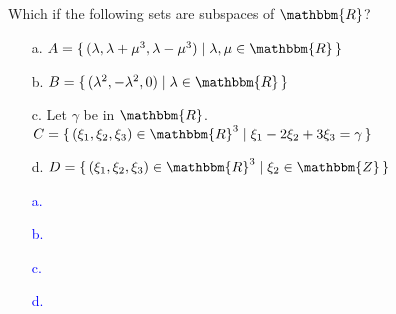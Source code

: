 \documentclass[a4paper,12pt]{article}
\newcommand{\Br}[1]{\{\, #1 \,\}}
\newcommand{\R}{\mathbbm{R}}
\newcommand{\Z}{\mathbbm{Z}}
\begin{document}
\subsection{}
Which if the following sets are subspaces of $\R$?
\begin{itemize}
 \item [a.] $A = \Br{(\lambda,\lambda+\mu^3,\lambda-\mu^3) \mid \lambda, \mu \in \R}$
 \item [b.] $B = \Br{(\lambda^2, -\lambda^2,0) \mid \lambda \in \R}$
 \item [c.] Let $\gamma$ be in $\R$. \\ $C = \Br{(\xi_1,\xi_2, \xi_3) \in \R^3 \mid \xi_1-2\xi_2+3\xi_3 = \gamma}$
 \item [d.] $D = \Br{(\xi_1,\xi_2, \xi_3) \in \R^3 \mid \xi_2 \in \Z}$
\end{itemize}
\textcolor{blue}{
\begin{itemize}
 \item [a.] 
 \item [b.] 
 \item [c.] 
 \item [d.] 
\end{itemize}
}
\end{document}
